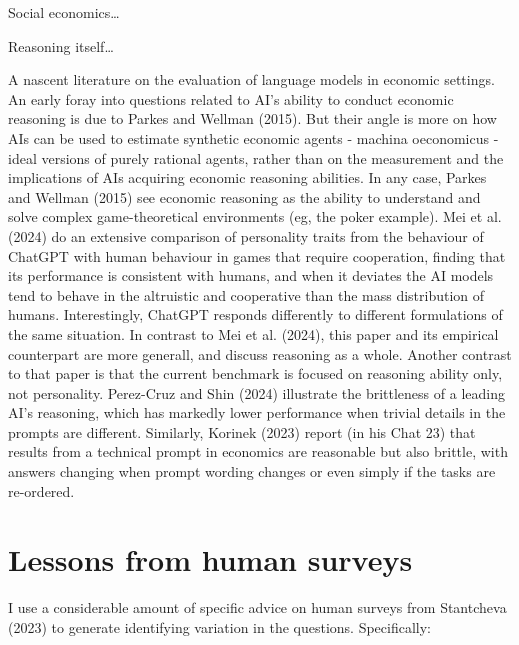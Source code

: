 \documentclass[
]{article}
\begin{document}
Social economics\ldots{}

Reasoning itself\ldots{}

A nascent literature on the evaluation of language models in economic
settings. An early foray into questions related to AI's ability to
conduct economic reasoning is due to Parkes and Wellman (2015). But
their angle is more on how AIs can be used to estimate synthetic
economic agents - machina oeconomicus - ideal versions of purely
rational agents, rather than on the measurement and the implications of
AIs acquiring economic reasoning abilities. In any case, Parkes and
Wellman (2015) see economic reasoning as the ability to understand and
solve complex game-theoretical environments (eg, the poker example). Mei
et al. (2024) do an extensive comparison of personality traits from the
behaviour of ChatGPT with human behaviour in games that require
cooperation, finding that its performance is consistent with humans, and
when it deviates the AI models tend to behave in the altruistic and
cooperative than the mass distribution of humans. Interestingly, ChatGPT
responds differently to different formulations of the same situation. In
contrast to Mei et al. (2024), this paper and its empirical counterpart
are more generall, and discuss reasoning as a whole. Another contrast to
that paper is that the current benchmark is focused on reasoning ability
only, not personality. Perez-Cruz and Shin (2024) illustrate the
brittleness of a leading AI's reasoning, which has markedly lower
performance when trivial details in the prompts are different.
Similarly, Korinek (2023) report (in his Chat 23) that results from a
technical prompt in economics are reasonable but also brittle, with
answers changing when prompt wording changes or even simply if the tasks
are re-ordered.

\hypertarget{lessons-from-human-surveys}{%
\section{Lessons from human surveys}\label{lessons-from-human-surveys}}

I use a considerable amount of specific advice on human surveys from
Stantcheva (2023) to generate identifying variation in the questions.
Specifically:
\end{document}
